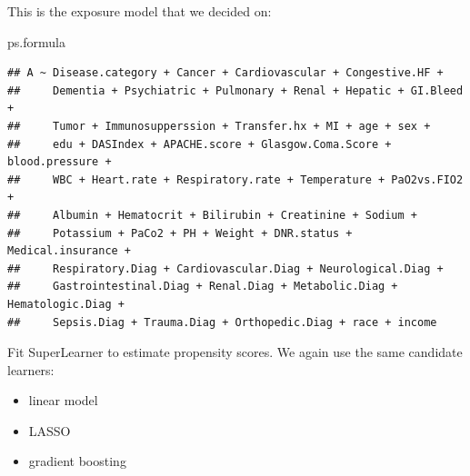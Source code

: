 \documentclass[
]{book}
\newenvironment{Shaded}{\begin{snugshade}}{\end{snugshade}}
\newcommand{\AttributeTok}[1]{\textcolor[rgb]{0.77,0.63,0.00}{#1}}
\newcommand{\DecValTok}[1]{\textcolor[rgb]{0.00,0.00,0.81}{#1}}
\newcommand{\FunctionTok}[1]{\textcolor[rgb]{0.00,0.00,0.00}{#1}}
\newcommand{\NormalTok}[1]{#1}
\newcommand{\OtherTok}[1]{\textcolor[rgb]{0.56,0.35,0.01}{#1}}
\newcommand{\SpecialCharTok}[1]{\textcolor[rgb]{0.00,0.00,0.00}{#1}}
\newcommand{\StringTok}[1]{\textcolor[rgb]{0.31,0.60,0.02}{#1}}
\providecommand{\tightlist}{%
  \setlength{\itemsep}{0pt}\setlength{\parskip}{0pt}}
\begin{document}
This is the exposure model that we decided on:

\begin{Shaded}
\begin{Highlighting}[]
\NormalTok{ps.formula}
\end{Highlighting}
\end{Shaded}

\begin{verbatim}
## A ~ Disease.category + Cancer + Cardiovascular + Congestive.HF + 
##     Dementia + Psychiatric + Pulmonary + Renal + Hepatic + GI.Bleed + 
##     Tumor + Immunosupperssion + Transfer.hx + MI + age + sex + 
##     edu + DASIndex + APACHE.score + Glasgow.Coma.Score + blood.pressure + 
##     WBC + Heart.rate + Respiratory.rate + Temperature + PaO2vs.FIO2 + 
##     Albumin + Hematocrit + Bilirubin + Creatinine + Sodium + 
##     Potassium + PaCo2 + PH + Weight + DNR.status + Medical.insurance + 
##     Respiratory.Diag + Cardiovascular.Diag + Neurological.Diag + 
##     Gastrointestinal.Diag + Renal.Diag + Metabolic.Diag + Hematologic.Diag + 
##     Sepsis.Diag + Trauma.Diag + Orthopedic.Diag + race + income
\end{verbatim}

Fit SuperLearner to estimate propensity scores. We again use the same candidate learners:

\begin{itemize}
\tightlist
\item
  linear model
\item
  LASSO
\item
  gradient boosting
\end{itemize}

\begin{Shaded}
\end{Shaded}
\end{document}
